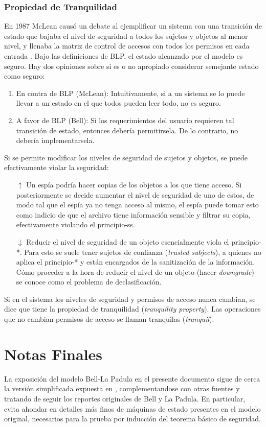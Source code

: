 \documentclass{article}
\theoremstyle{definition}
\begin{document}
\subsubsection*{Propiedad de Tranquilidad} 
En 1987 McLean causó un debate al ejemplificar un sistema con una transición de
estado que bajaba el nivel de seguridad a todos los sujetos y objetos al menor
nivel, y llenaba la matriz de control de accesos con todos los permisos en cada
entrada \cite{m87}. Bajo las definiciones de BLP, el estado alcanzado por el modelo es
seguro. Hay dos opiniones sobre si es o no apropiado considerar semejante estado
como seguro:
\begin{enumerate}
  \item En contra de BLP (McLean): Intuitivamente, si a un sistema se lo puede
    llevar a un estado en el que todos pueden leer todo, no es seguro. 
  \item A favor de BLP (Bell): Si los requerimientos del usuario requieren tal
    transición de estado, entonces debería permitirsela. De lo contrario, no
    debería implementarsela.
\end{enumerate}
Si se permite modificar los niveles de seguridad de sujetos y objetos, se puede
efectivamente violar la seguridad:
\begin{itemize}
  \item[$\uparrow$] Un espía podría hacer copias de los objetos a los que tiene acceso. Si
    posteriormente se decide aumentar el nivel de seguridad de uno de estos, de
    modo tal que el espía ya no tenga acceso al mismo, el espía puede tomar esto
    como indicio de que el archivo tiene información sensible y filtrar su
    copia, efectivamente violando el principio-ss.
  \item[$\downarrow$] Reducir el nivel de seguridad de un objeto esencialmente
    viola el principio-*. Para esto se suele tener sujetos de confianza
    (\textit{trusted subjects}), a quienes no aplica el principio-* y están
    encargados de la sanitización de la información. Cómo proceder a la hora de
    reducir el nivel de un objeto (hacer \textit{downgrade}) se conoce como el
    problema de declasificación.
\end{itemize}

Si en el sistema los niveles de seguridad y permisos de
acceso nunca cambian, se dice que tiene la propiedad de tranquilidad
(\textit{tranquility property}). Las operaciones que no cambian permisos de
acceso se llaman tranquilas (\textit{tranquil}).

\section*{Notas Finales}
La exposición del modelo Bell-La Padula en el presente documento sigue de cerca
la versión simplificada expuesta en \cite{Bishop}, complementandose con otras
fuentes \cite{g11, a08, t11} y tratando de seguir los reportes originales de Bell y
La Padula. En particular, evita ahondar en detalles más finos de máquinas de
estado presentes en el modelo original, necesarios para la prueba por inducción
del teorema básico de seguridad.
\end{document}
